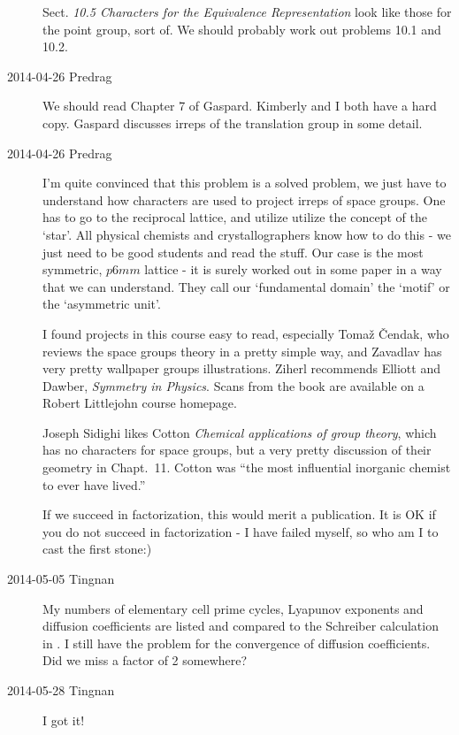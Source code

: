 \begin{description}
Sect. {\em 10.5 Characters for the Equivalence Representation} look
like those for the point group, sort of. We should probably work
out problems 10.1 and 10.2.

\item[2014-04-26 Predrag] We should read Chapter 7 of Gaspard.
Kimberly and I both have a hard copy. Gaspard discusses irreps of
the translation group in some detail.

\item[2014-04-26 Predrag]
I'm quite convinced that this problem is a solved problem, we just have
to understand how characters are used to project irreps of space groups.
One has to go to the reciprocal lattice, and utilize utilize the concept
of the `star'. All physical chemists and crystallographers know how to do
this - we just need to be good students and read the stuff. Our case is
the most symmetric, $p6mm$ lattice - it is surely worked out in some
paper in a way that we can understand. They call our `fundamental domain'
the `motif' or the `asymmetric unit'.

I found projects in  {this
course} easy to read, especially Toma\v{z} \v{C}endak, who reviews the
space groups theory in a pretty simple way, and Zavadlav has very pretty
wallpaper groups illustrations. Ziherl recommends Elliott and  Dawber,
{\em Symmetry in Physics}. Scans from the book are available on
a Robert Littlejohn course
 {homepage}.

Joseph Sidighi likes Cotton {\em Chemical applications of
group theory}, which has no characters for space groups, but a very
pretty discussion of their geometry in Chapt.~11. Cotton was ``the most
influential inorganic chemist to ever have lived.''

If we succeed in factorization, this would merit a publication.
It is OK if you do not succeed in factorization - I have failed myself, so
who am I to cast the first stone:)

\item[2014-05-05 Tingnan] My numbers of elementary cell prime cycles,
Lyapunov exponents and diffusion coefficients are listed and compared
to the Schreiber calculation in . I still have the problem
for the convergence of diffusion coefficients. Did we miss a factor of 2
somewhere?

\item[2014-05-28 Tingnan] I got it!


\end{description}
